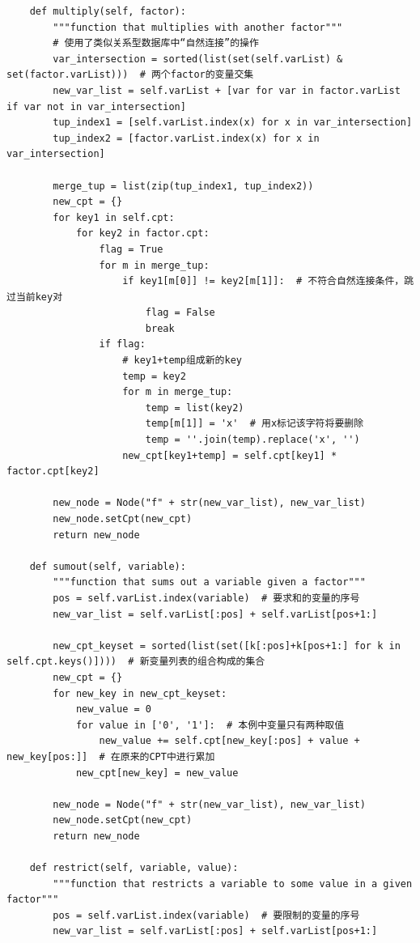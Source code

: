 \documentclass[a4paper, 11pt]{article}
\begin{document}
\begin{lstlisting}
    def multiply(self, factor):
        """function that multiplies with another factor"""
        # 使用了类似关系型数据库中“自然连接”的操作
        var_intersection = sorted(list(set(self.varList) & set(factor.varList)))  # 两个factor的变量交集
        new_var_list = self.varList + [var for var in factor.varList if var not in var_intersection]
        tup_index1 = [self.varList.index(x) for x in var_intersection]
        tup_index2 = [factor.varList.index(x) for x in var_intersection]
        
        merge_tup = list(zip(tup_index1, tup_index2))
        new_cpt = {}
        for key1 in self.cpt:
            for key2 in factor.cpt:
                flag = True
                for m in merge_tup:
                    if key1[m[0]] != key2[m[1]]:  # 不符合自然连接条件，跳过当前key对
                        flag = False
                        break
                if flag:
                    # key1+temp组成新的key
                    temp = key2
                    for m in merge_tup:
                        temp = list(key2)
                        temp[m[1]] = 'x'  # 用x标记该字符将要删除
                        temp = ''.join(temp).replace('x', '')
                    new_cpt[key1+temp] = self.cpt[key1] * factor.cpt[key2]

        new_node = Node("f" + str(new_var_list), new_var_list)
        new_node.setCpt(new_cpt)
        return new_node

    def sumout(self, variable):
        """function that sums out a variable given a factor"""
        pos = self.varList.index(variable)  # 要求和的变量的序号
        new_var_list = self.varList[:pos] + self.varList[pos+1:]

        new_cpt_keyset = sorted(list(set([k[:pos]+k[pos+1:] for k in self.cpt.keys()])))  # 新变量列表的组合构成的集合
        new_cpt = {}
        for new_key in new_cpt_keyset:
            new_value = 0
            for value in ['0', '1']:  # 本例中变量只有两种取值
                new_value += self.cpt[new_key[:pos] + value + new_key[pos:]]  # 在原来的CPT中进行累加
            new_cpt[new_key] = new_value

        new_node = Node("f" + str(new_var_list), new_var_list)
        new_node.setCpt(new_cpt)
        return new_node
        
    def restrict(self, variable, value):
        """function that restricts a variable to some value in a given factor"""
        pos = self.varList.index(variable)  # 要限制的变量的序号
        new_var_list = self.varList[:pos] + self.varList[pos+1:]


\end{lstlisting}
\end{document}
